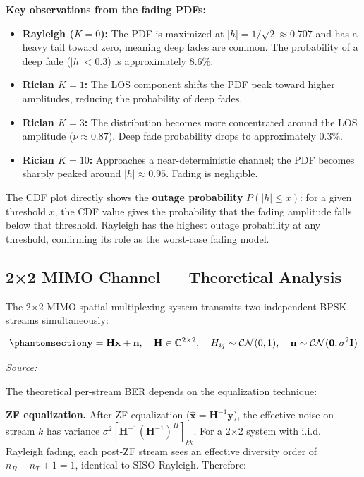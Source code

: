\textbf{Key observations from the fading PDFs:}

\begin{itemize}
\tightlist
\item
  \textbf{Rayleigh (\(K=0\)):} The PDF is maximized at \(|h| = 1/\sqrt{2} \approx 0.707\) and has a heavy tail toward zero, meaning deep fades are common. The probability of a deep fade (\(|h| < 0.3\)) is approximately 8.6\%.
\item
  \textbf{Rician \(K=1\):} The LOS component shifts the PDF peak toward higher amplitudes, reducing the probability of deep fades.
\item
  \textbf{Rician \(K=3\):} The distribution becomes more concentrated around the LOS amplitude (\(\nu \approx 0.87\)). Deep fade probability drops to approximately 0.3\%.
\item
  \textbf{Rician \(K=10\):} Approaches a near-deterministic channel; the PDF becomes sharply peaked around \(|h| \approx 0.95\). Fading is negligible.
\end{itemize}

The CDF plot directly shows the \textbf{outage probability} \(P(|h| \leq x)\): for a given threshold \(x\), the CDF value gives the probability that the fading amplitude falls below that threshold. Rayleigh has the highest outage probability at any threshold, confirming its role as the worst-case fading model.


\subsection{2×2 MIMO Channel --- Theoretical Analysis}\label{sec:mimo-channel-theoretical-analysis}

The 2×2 MIMO spatial multiplexing system transmits two independent BPSK streams simultaneously:

\begin{equation}\protect\phantomsection\label{eq:mimo-received-2x2}{\mathbf{y} = \mathbf{H}\mathbf{x} + \mathbf{n}, \quad \mathbf{H} \in \mathbb{C}^{2 \times 2}, \quad H_{ij} \sim \mathcal{CN}(0, 1), \quad \mathbf{n} \sim \mathcal{CN}(\mathbf{0}, \sigma^2\mathbf{I})
}\end{equation} \par{\small\textit{Source: \cite{tse2005fundamentals}}}

The theoretical per-stream BER depends on the equalization technique:

\textbf{ZF equalization.} After ZF equalization (\(\hat{\mathbf{x}} = \mathbf{H}^{-1}\mathbf{y}\)), the effective noise on stream \(k\) has variance \(\sigma^2 [\mathbf{H}^{-1}(\mathbf{H}^{-1})^H]_{kk}\). For a 2×2 system with i.i.d. Rayleigh fading, each post-ZF stream sees an effective diversity order of \(n_R - n_T + 1 = 1\), identical to SISO Rayleigh. Therefore:

